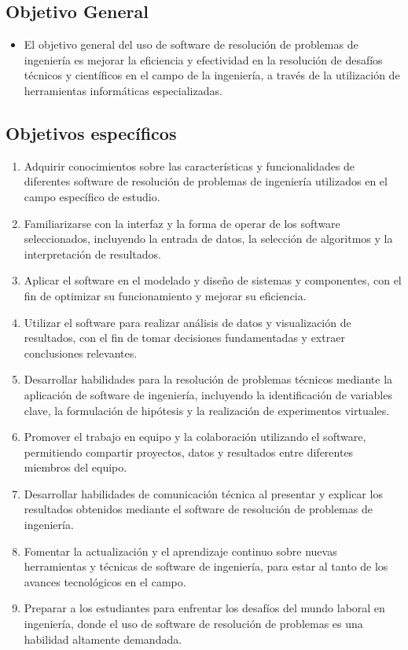 \documentclass[conference]{IEEEtran}
\begin{document}
\subsection{Objetivo General}
\begin{itemize}
    \item El objetivo general del uso de software de resolución de problemas de ingeniería es mejorar la eficiencia y efectividad en la resolución de desafíos técnicos y científicos en el campo de la ingeniería, a través de la utilización de herramientas informáticas especializadas.
\end{itemize}

\subsection{Objetivos específicos}
\begin{enumerate}
    \item Adquirir conocimientos sobre las características y funcionalidades de diferentes software de resolución de problemas de ingeniería utilizados en el campo específico de estudio.
    \item Familiarizarse con la interfaz y la forma de operar de los software seleccionados, incluyendo la entrada de datos, la selección de algoritmos y la interpretación de resultados.
    \item Aplicar el software en el modelado y diseño de sistemas y componentes, con el fin de optimizar su funcionamiento y mejorar su eficiencia.
    \item Utilizar el software para realizar análisis de datos y visualización de resultados, con el fin de tomar decisiones fundamentadas y extraer conclusiones relevantes.
    \item Desarrollar habilidades para la resolución de problemas técnicos mediante la aplicación de software de ingeniería, incluyendo la identificación de variables clave, la formulación de hipótesis y la realización de experimentos virtuales.
    \item Promover el trabajo en equipo y la colaboración utilizando el software, permitiendo compartir proyectos, datos y resultados entre diferentes miembros del equipo.
    \item Desarrollar habilidades de comunicación técnica al presentar y explicar los resultados obtenidos mediante el software de resolución de problemas de ingeniería.
    \item Fomentar la actualización y el aprendizaje continuo sobre nuevas herramientas y técnicas de software de ingeniería, para estar al tanto de los avances tecnológicos en el campo.
    \item Preparar a los estudiantes para enfrentar los desafíos del mundo laboral en ingeniería, donde el uso de software de resolución de problemas es una habilidad altamente demandada.
\end{enumerate}
\end{document}
